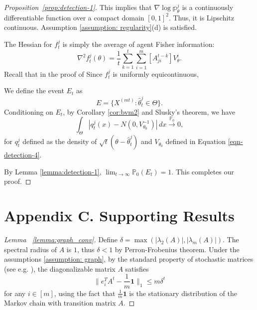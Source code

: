 \documentclass[twoside,11pt]{article}
\numberwithin{equation}{section}
\newcommand\bP{\mathbb{P}}
\newcommand\bp{\mathbb{p}}
\newcommand{\ones}{\mathbf{1}}
\newcommand{\pto}{\stackrel{\bP_0}{\to}}
\begin{document}
{\begin{proof}[Proposition~\ref{prop:detection-1}]
This implies that $\nabla \log \bp_\theta^j$ is a continuously differentiable function over a compact domain $[0,1]^2$. Thus, it is Lipschitz continuous. Assumption \ref{assumption: regularity}(d) is satisfied. 
 
The Hessian for $f_t^j$ is simply the average of agent Fisher information: 
\begin{equation*}
    \nabla^2 f_t^j(\theta) = \frac{1}{t} \sum_{k = 1}^t \sum_{i = 1}^m [A^{t-k}_{ji}] V_\theta^i. 
\end{equation*}
Recall that in the proof of 
Since $f_t^j$ is uniformly equicontinuous, 

We define the event $E_t$ as 
\begin{equation*}
    E = \{X^{(mt)}:\hat \theta_t^j \in \Theta\}. 
\end{equation*}
Conditioning on $E_t$, by Corollary \ref{cor:bvm2} and Slusky's theorem, we have
\begin{equation*}
    \int_\Theta \left|q_t^j(x) - N(0,  V_{\theta_0}^{-1})\right| \, dx \pto 0, 
\end{equation*}
for  $q_t^j$ defined as the density of $\sqrt{t}(\theta - \hat{\theta}_t^j)$ and $V_{\theta_0}$ defined in Equation \eqref{eqn-detection-4}. 

By Lemma \ref{lemma:detection-1}, $\lim_{t \to \infty}\bP_0(E_t) = 1$. This completes our proof. 
\end{proof}

\section*{Appendix C. Supporting Results}
\label{app:support}
\begin{proof} [Lemma ~\ref{lemma:graph_conv}]
Define $\delta = \max(|\lambda_2(A)|, |\lambda_m(A)|)$. The spectral radius of $A$ is $1$, thus $\delta <1$ by Perron-Frobenius theorem.  Under the assumptions \ref{assumption: graph}, by the standard property of stochastic matrices (see e.g. \cite{rosenthal1995convergence}), the diagonalizable matrix $A$ satisfies 
    \begin{equation} \label{eqn:graph_conv-1}
        \|e_i^T A^t - \frac{1}{m} \ones \|_1 \leq m \delta^t
    \end{equation}
    for any $i \in [m]$, using the fact that $\frac{1}{m} \ones$ is the stationary distribution of the Markov chain with transition matrix $A$. 


\end{proof}}
\end{document}
